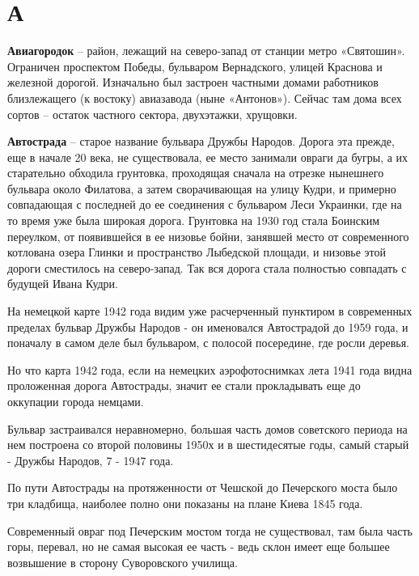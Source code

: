 \chapter*{А}


\textbf{Авиагородок} – район, лежащий на северо-запад от станции метро «Святошин». Ограничен проспектом Победы, бульваром Вернадского, улицей Краснова и железной дорогой. Изначально был застроен частными домами работников близлежащего (к востоку) авиазавода (ныне «Антонов»). Сейчас там дома всех сортов – остаток частного сектора, двухэтажки, хрущовки.\\

\medskip

\textbf{Автострада} – старое название бульвара Дру\-жбы Народов. Дорога эта прежде, еще в начале 20 века, не существовала, ее место занимали овраги да бугры, а их старательно обходила грунтовка, проходящая сначала на отрезке нынешнего бульвара около Филатова, а затем сворачивающая на улицу Кудри, и примерно совпадающая с последней до ее соединения с бульваром Леси Украинки, где на то время уже была широкая дорога. Грунтовка на 1930 год стала Боинским переулком, от появившейся в ее низовье бойни, занявшей место от современного котлована озера Глинки и пространство Лыбедской площади, и низовье этой дороги сместилось на северо-запад. Так вся дорога стала полностью совпадать с будущей Ивана Кудри.

На немецкой карте 1942 года видим уже расчерченный пунктиром в современных пределах бульвар Дружбы Народов - он именовался Автострадой до 1959 года, и поначалу в самом деле был бульваром, с полосой посередине, где росли деревья.

Но что карта 1942 года, если на немецких аэрофотоснимках лета 1941 года видна проложенная дорога Автострады, значит ее стали прокладывать еще до оккупации города немцами.

Бульвар застраивался неравномерно, большая часть домов советского периода на нем построена со второй половины 1950х и в шестидесятые годы, самый старый - Дружбы Народов, 7 - 1947 года.

По пути Автострады на протяженности от Чешской до Печерского моста было три кладбища, наиболее полно они показаны на плане Киева 1845 года. 

Современный овраг под Печерским мостом тогда не существовал, там была часть горы, перевал, но не самая высокая ее часть - ведь склон имеет еще большее возвышение в сторону Суворовского училища.

